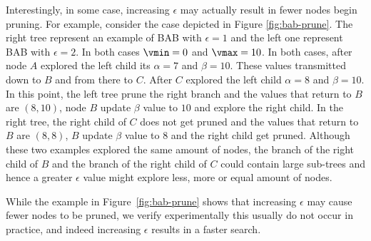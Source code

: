 Interestingly, in some case, increasing $\epsilon$ may actually result in fewer nodes begin pruning. For example, consider the case depicted in 
Figure \ref{fig:bab-prune}. The right tree represent an example of BAB with $\epsilon = 1$ and the left one represent BAB with $\epsilon = 2$. In both cases $\vmin = 0$ and $\vmax = 10$. In both cases, after node $A$ explored the left child its $\alpha = 7$ and $\beta = 10$. These values transmitted down to $B$ and from there to $C$. After $C$ explored the left child $\alpha = 8$ and $\beta = 10$. In this point, the left tree prune the right branch and the values that return to $B$ are $(8,10)$, node $B$ update $\beta$ value to $10$ and explore the right child. In the right tree, the right child of $C$ does not get pruned and the values that return to $B$ are $(8,8)$, $B$ update $\beta$ value to $8$ and the right child get pruned. Although these two examples explored the same amount of nodes, the branch of the right child of $B$ and the branch of the right child of $C$ could contain large sub-trees and hence a greater $\epsilon$ value might explore less, more or equal amount of nodes. 


While the example in Figure~\ref{fig:bab-prune} shows that increasing $\epsilon$ may cause fewer nodes to be pruned, we verify experimentally  this usually do not occur in practice, and indeed increasing $\epsilon$ results in a faster search. %

